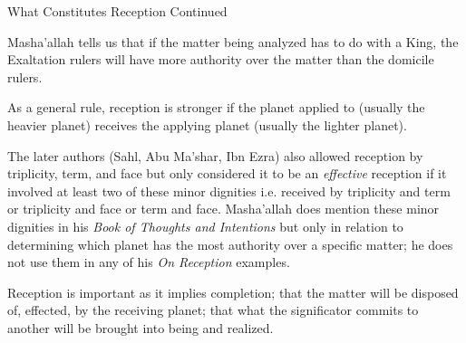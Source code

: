 \begin{frame}[t]{What Constitutes Reception Continued}

Masha'allah tells us that if the matter being analyzed has to do with a King, the Exaltation rulers will have more authority over the matter than the domicile rulers.

As a general rule, reception is stronger if the planet applied to (usually the heavier planet) receives the applying planet (usually the lighter planet).

The later authors (Sahl, Abu Ma'shar, Ibn Ezra) also allowed reception by triplicity, term, and face but only considered it to be an \textsl{effective} reception if it involved at least two of these minor dignities i.e. received by triplicity and term or triplicity and face or term and face. Masha'allah does mention these minor dignities in his \textsl{Book of Thoughts and Intentions} but only in relation to determining which planet has the most authority over a specific matter; he does not use them in any of his \textsl{On Reception} examples.\footnotemark[1]
\begin{block}{}
Reception is important as it implies completion; that the matter will be disposed of, effected, by the receiving planet; that what the significator commits to another will be brought into being and realized.
\end{block}
\end{frame}